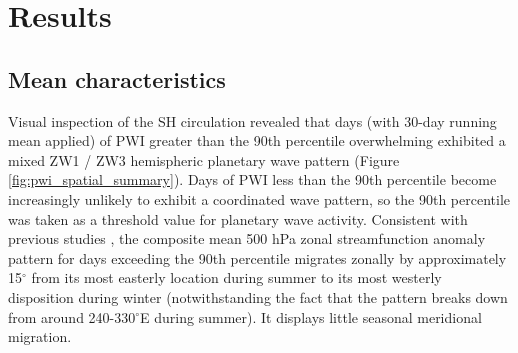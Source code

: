 \section{Results}

\subsection{Mean characteristics}

Visual inspection of the SH circulation revealed that days (with 30-day running mean applied) of PWI greater than the 90th percentile overwhelming exhibited a mixed ZW1 / ZW3 hemispheric planetary wave pattern (Figure \ref{fig:pwi_spatial_summary}). Days of PWI less than the 90th percentile become increasingly unlikely to exhibit a coordinated wave pattern, so the 90th percentile was taken as a threshold value for planetary wave activity. Consistent with previous studies \citep{vanLoon1984,Mo1985}, the composite mean 500 hPa zonal streamfunction anomaly pattern for days exceeding the 90th percentile migrates zonally by approximately 15$^{\circ}$ from its most easterly location during summer to its most westerly disposition during winter (notwithstanding the fact that the pattern breaks down from around 240-330$^{\circ}$E during summer). It displays little seasonal meridional migration.
